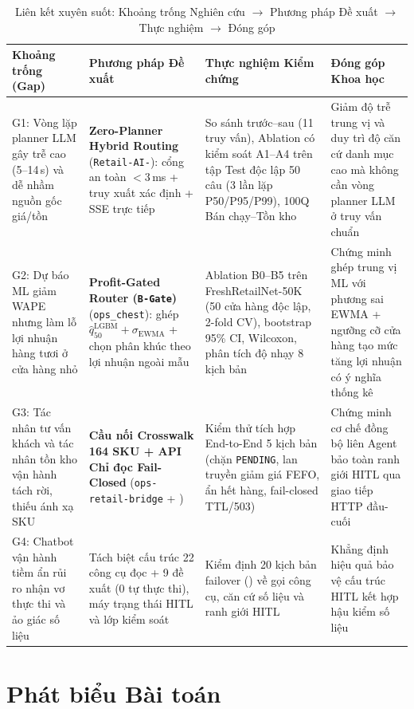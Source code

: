 \begin{table}[H]
\centering
\caption{Liên kết xuyên suốt: Khoảng trống Nghiên cứu $\to$ Phương pháp Đề xuất $\to$ Thực nghiệm $\to$ Đóng góp}
\label{tab:gap_traceability}
\footnotesize
\begin{tabularx}{\textwidth}{L{3.1cm} L{3.3cm} L{3.6cm} Y}
\toprule
\textbf{Khoảng trống (Gap)} & \textbf{Phương pháp Đề xuất} & \textbf{Thực nghiệm Kiểm chứng} & \textbf{Đóng góp Khoa học} \\
\midrule
G1: Vòng lặp planner LLM gây trễ cao (5--14\,s) và dễ nhầm nguồn gốc giá/tồn & \textbf{Zero-Planner Hybrid Routing} (\texttt{Retail-AI-}): cổng an toàn $<3$\,ms + truy xuất xác định + SSE trực tiếp & So sánh trước--sau (11 truy vấn), Ablation có kiểm soát A1--A4 trên tập Test độc lập 50 câu (3 lần lặp P50/P95/P99), 100Q Bán chạy--Tồn kho & Giảm độ trễ trung vị và duy trì độ căn cứ danh mục cao mà không cần vòng planner LLM ở truy vấn chuẩn \\
G2: Dự báo ML giảm WAPE nhưng làm lỗ lợi nhuận hàng tươi ở cửa hàng nhỏ & \textbf{Profit-Gated Router (\texttt{B-Gate})} (\texttt{ops\_chest}): ghép $\hat{q}_{50}^{\text{LGBM}} + \sigma_{\text{EWMA}}$ + chọn phân khúc theo lợi nhuận ngoài mẫu & Ablation B0--B5 trên FreshRetailNet-50K (50 cửa hàng độc lập, 2-fold CV), bootstrap 95\% CI, Wilcoxon, phân tích độ nhạy 8 kịch bản & Chứng minh ghép trung vị ML với phương sai EWMA + ngưỡng cỡ cửa hàng tạo mức tăng lợi nhuận có ý nghĩa thống kê \\
G3: Tác nhân tư vấn khách và tác nhân tồn kho vận hành tách rời, thiếu ánh xạ SKU & \textbf{Cầu nối Crosswalk 164 SKU + API Chỉ đọc Fail-Closed} (\texttt{ops-retail-bridge} + ) & Kiểm thử tích hợp End-to-End 5 kịch bản (chặn \texttt{PENDING}, lan truyền giảm giá FEFO, ẩn hết hàng, fail-closed TTL/503) & Chứng minh cơ chế đồng bộ liên Agent bảo toàn ranh giới HITL qua giao tiếp HTTP đầu-cuối \\
G4: Chatbot vận hành tiềm ẩn rủi ro nhận vơ thực thi và ảo giác số liệu & Tách biệt cấu trúc 22 công cụ đọc + 9 đề xuất (0 tự thực thi), máy trạng thái HITL và lớp kiểm soát  & Kiểm định 20 kịch bản failover () về gọi công cụ, căn cứ số liệu và ranh giới HITL & Khẳng định hiệu quả bảo vệ cấu trúc HITL kết hợp hậu kiểm số liệu  \\
\bottomrule
\end{tabularx}
\end{table}

\section{Phát biểu Bài toán}

